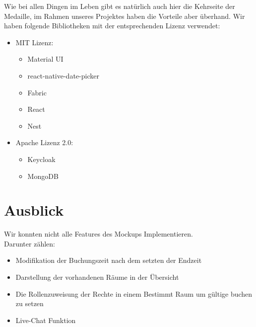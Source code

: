 Wie bei allen Dingen im Leben gibt es natürlich auch hier die Kehrseite der Medaille, im Rahmen unseres Projektes haben die Vorteile aber überhand. 
Wir haben folgende Bibliotheken mit der entsprechenden Lizenz verwendet:

\begin{itemize}
\item	MIT Lizenz:
\begin{itemize}
    \item	Material UI
    \item	react-native-date-picker
    \item	Fabric
    \item	React
    \item	Nest
\end{itemize}
\end{itemize}
\begin{itemize}
    \item	Apache Lizenz 2.0:
    \begin{itemize}
\item	Keycloak
\item	MongoDB
\end{itemize}
\end{itemize}


\section{Ausblick}
 Wir konnten nicht alle Features des Mockups Implementieren. \\
 Darunter zählen:
\begin{itemize}
    \item	Modifikation der Buchungszeit nach dem setzten der Endzeit
    \item	Darstellung der vorhandenen Räume in der Übersicht
    \item	Die Rollenzuweisung der Rechte in einem Bestimmt Raum um gültige buchen zu setzen 
    \item	Live-Chat Funktion  
\end{itemize}
